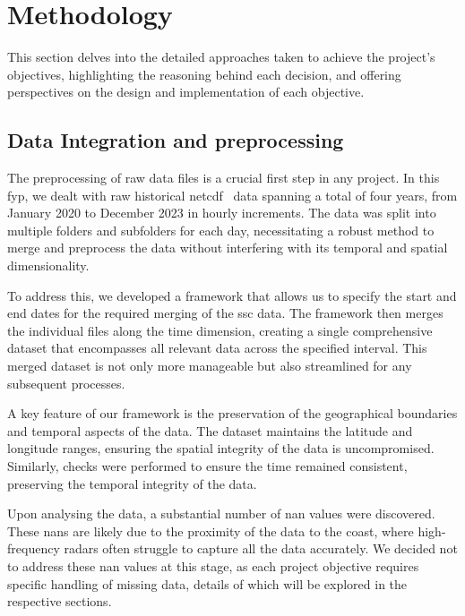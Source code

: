 \graphicspath{{content/chapters/3_methodology/methodology_figures}}

\chapter{Methodology}
\label{chp:methodology}

This section delves into the detailed approaches taken to achieve the project’s objectives, highlighting the reasoning behind each decision, and offering perspectives on the design and implementation of each objective.

\section{Data Integration and preprocessing}
\label{sec:3.1}

The preprocessing of raw data files is a crucial first step in any project. In this \acrshort{fyp}, we dealt with raw historical \acrshort{netcdf}~\cite{13} data spanning a total of four years, from January 2020 to December 2023 in hourly increments. The data was split into multiple folders and subfolders for each day, necessitating a robust method to merge and preprocess the data without interfering with its temporal and spatial dimensionality.

To address this, we developed a framework that allows us to specify the start and end dates for the required merging of the \acrshort{ssc} data. The framework then merges the individual files along the time dimension, creating a single comprehensive dataset that encompasses all relevant data across the specified interval. This merged dataset is not only more manageable but also streamlined for any subsequent processes.

A key feature of our framework is the preservation of the geographical boundaries and temporal aspects of the data. The dataset maintains the latitude and longitude ranges, ensuring the spatial integrity of the data is uncompromised. Similarly, checks were performed to ensure the time remained consistent, preserving the temporal integrity of the data.

Upon analysing the data, a substantial number of \acrshort{nan} values were discovered. These \acrshort{nan}s are likely due to the proximity of the data to the coast, where high-frequency radars  often struggle to capture all the data accurately. We decided not to address these \acrshort{nan} values at this stage, as each project objective requires specific handling of missing data, details of which will be explored in the respective sections.

